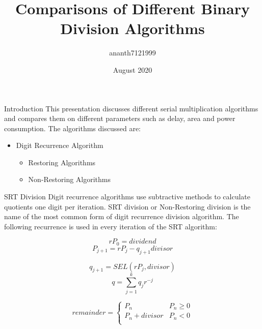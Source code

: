 \documentclass[10pt]{beamer}
\title{Comparisons of Different Binary Division Algorithms}
\author{ananth7121999 }
\date{August 2020}
\begin{document}
\begin{frame}{}
\maketitle
\end{frame}

\begin{frame}{Introduction}
This presentation discusses different serial multiplication algorithms and compares them on different parameters such as delay, area and power consumption. The algorithms discussed are:
\begin{itemize}
\item Digit Recurrence Algorithm
\begin{itemize}
\item Restoring Algorithms
\item Non-Restoring Algorithms
\end{itemize}
\end{itemize}
\end{frame}
\begin{frame}{SRT Division}
Digit recurrence algorithms use subtractive methods to calculate  quotients  one  digit  per  iteration.  SRT  division or Non-Restoring division  is  the name of the most common form of digit recurrence division algorithm.
The following recurrence is used in every iteration of the SRT algorithm:
\begin{minipage}[t]{0.5\textwidth}
\begin{equation}
rP_0 = dividend
\end{equation}
\begin{equation}
P_{j+1} = rP_{j} - q_{j+1}divisor
\end{equation}
\end{minipage}%
\begin{minipage}[t]{0.5\textwidth}
\begin{equation}
q_{j+1} = SEL(rP_{j}, divisor)
\end{equation}
\begin{equation}
q = \sum_{j = 1}^{k} q_{j}r^{-j}
\end{equation}
\end{minipage}
\begin{equation}
remainder = 
\begin{cases} 
      P_n &  P_n \geq 0 \\
      P_n + divisor & P_n<0 \\
\end{cases}
\end{equation}
\end{frame}
\end{document}
